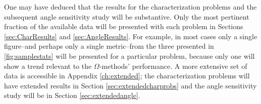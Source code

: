 One may have deduced that the results for the characterization
problems and the subsequent angle
sensitivity study will be substantive. Only the most
pertinent fraction of the available data will be presented with each problem in
Sections \ref{sec:CharResults} and \ref{sec:AngleResults}. For example, in most
cases only a single figure--and perhaps only a single metric--from the
three presented in \ref{fig:samplestats}
will be presented for a particular problem, because only one will show a trend
relevant to the $\Omega$-methods' performance.
A more extensive set of data is accessible in Appendix \ref{ch:extended}; the
characterization problems will have extended results in Section
\ref{sec:extendedcharprobs} and the angle sensitivity study will be in
Section \ref{sec:extendedangle}.

